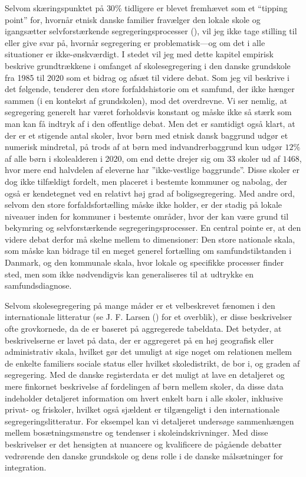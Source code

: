 \documentclass[
]{book}
\begin{document}
Selvom skæringspunktet på \(30\%\) tidligere er blevet fremhævet som et ``tipping point'' for, hvornår etnisk danske familier fravælger den lokale skole og igangsætter selvforstærkende segregeringsprocesser (), vil jeg ikke tage stilling til eller give svar på, hvornår segregering er problematisk---og om det i alle situationer er ikke-ønskværdigt. I stedet vil jeg med dette kapitel empirisk beskrive grundtrækkene i omfanget af skolesegregering i den danske grundskole fra 1985 til 2020 som et bidrag og afsæt til videre debat.
Som jeg vil beskrive i det følgende, tenderer den store forfaldshistorie om et samfund, der ikke hænger sammen (i en kontekst af grundskolen), mod det overdrevne. Vi ser nemlig, at segregering generelt har været forholdsvis konstant og måske ikke så stærk som man kan få indtryk af i den offentlige debat. Men det er samtidigt også klart, at der er et stigende antal skoler, hvor børn med etnisk dansk baggrund udgør et numerisk mindretal, på trods af at børn med indvandrerbaggrund kun udgør \(12\%\) af alle børn i skolealderen i 2020, om end dette drejer sig om \(33\) skoler ud af \(1468\), hvor mere end halvdelen af eleverne har ''ikke-vestlige baggrunde''. Disse skoler er dog ikke tilfældigt fordelt, men placeret i bestemte kommuner og nabolag, der også er kendetegnet ved en relativt høj grad af boligsegregering. Med andre ord, selvom den store forfaldsfortælling måske ikke holder, er der stadig på lokale niveauer inden for kommuner i bestemte områder, hvor der kan være grund til bekymring og selvforstærkende segregeringsprocesser. En central pointe er, at den videre debat derfor må skelne mellem to dimensioner: Den store nationale skala, som måske kan bidrage til en meget generel fortælling om samfundstilstanden i Danmark, og den kommunale skala, hvor lokale og specifikke processer finder sted, men som ikke nødvendigvis kan generaliseres til at udtrykke en samfundsdiagnose.

Selvom skolesegregering på mange måder er et velbeskrevet fænomen i den internationale litteratur (se J. F. Larsen () for et overblik), er disse beskrivelser ofte grovkornede, da de er baseret på aggregerede tabeldata. Det betyder, at beskrivelserne er lavet på data, der er aggregeret på en høj geografisk eller administrativ skala, hvilket gør det umuligt at sige noget om relationen mellem de enkelte familiers sociale status eller hvilket skoledistrikt, de bor i, og graden af segregering. Med de danske registerdata er det muligt at lave en detaljeret og mere finkornet beskrivelse af fordelingen af børn mellem skoler, da disse data indeholder detaljeret information om hvert enkelt barn i alle skoler, inklusive privat- og friskoler, hvilket også sjældent er tilgængeligt i den internationale segregeringslitteratur. For eksempel kan vi detaljeret undersøge sammenhængen mellem bosætningsmønstre og tendenser i skoleindskrivninger. Med disse beskrivelser er det hensigten at nuancere og kvalificere de pågående debatter vedrørende den danske grundskole og dens rolle i de danske målsætninger for integration.
\end{document}
